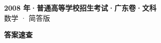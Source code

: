 \documentclass[zihao=-4, a4paper]{ctexart}
\begin{document}
\begin{center}
  {\Large\bfseries 2008 年·普通高等学校招生考试·广东卷·文科}\\[4pt]
  {\large 数学 · 简答版}
\end{center}
\medskip
{}

\clearpage
{}
\begin{center}{\Large\bfseries 答案速查}\end{center}
\medskip

\end{document}
